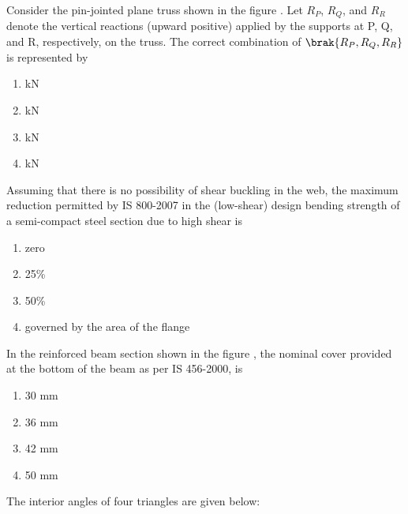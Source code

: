 \item Consider the pin-jointed plane truss shown in the figure . Let $R_P$, $R_Q$, and $R_R$ denote the vertical reactions (upward positive) applied by the supports at P, Q, and R, respectively, on the truss. The correct combination of $\brak{R_P, R_Q, R_R}$ is represented by
\begin{figure}[!ht]
\centering
\resizebox{0.7\textwidth}{!}{%

}%
\end{figure}
\begin{enumerate}
    \item {}kN
    \item {}kN
    \item {}kN
    \item {}kN \\
\end{enumerate}
\item Assuming that there is no possibility of shear buckling in the web, the maximum reduction permitted by IS 800-2007 in the (low-shear) design bending strength of a semi-compact steel section due to high shear is
 \begin{enumerate}
    \item zero
    \item 25\%
    \item 50\%
    \item governed by the area of the flange \\
\end{enumerate}
\item In the reinforced beam section shown in the figure , the nominal cover provided at the bottom of the beam as per IS 456-2000, is
\begin{figure}[!ht]
\centering
\resizebox{0.5\textwidth}{!}{%

}%
\end{figure}
\begin{enumerate}
    \item 30 mm
    \item 36 mm
    \item 42 mm
    \item 50 mm \\
\end{enumerate}
\item The interior angles of four triangles are given below:
\begin{table}[h!]
  \centering
  
\end{table}\\
